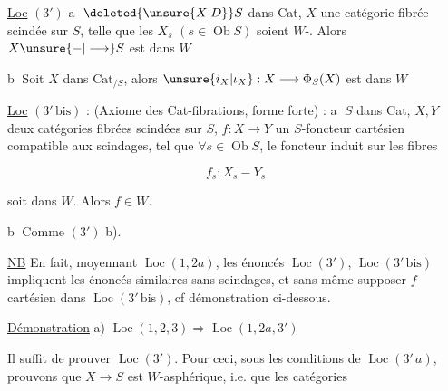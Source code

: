 



\uline{Loc} $(3')$ \textcircled{a}   $\deleted{\unsure{X|D}}S$ dans Cat, $X$ une catégorie fibrée scindée sur $S$, telle que les  $X_s$ $(s\in\operatorname{Ob}S)$ soient $W$-. Alors $X\unsure{{-}|\longrightarrow} S$ est dans $W$

\textcircled{b} Soit $X$ dans $\mathrm{Cat}_{/S}$, alors $\unsure{i_X|\iota_X}:X\longrightarrow\Phi_S(X)$ est dans $W$


\uline{Loc} $(3'\,\mathrm{bis})$ : (Axiome des Cat-fibrations, forme  forte) : \textcircled{a}  $S$ dans Cat, $X,Y$ deux catégories fibrées scindées sur $S$, $f:X\longrightarrow Y$ un $S$-foncteur cartésien compatible aux scindages, tel que $\forall s\in\operatorname{Ob}S$, le foncteur induit sur les fibres

\[
f_s:X_s{-}Y_s
\]

soit dans $W$. Alors $f\in W$.

\textcircled{b} Comme  $(3')$ b).

\uline{NB} En fait, moyennant $\operatorname{Loc}(1,2a)$, les énoncés $\operatorname{Loc}(3')$, $\operatorname{Loc}(3'\,\mathrm{bis})$ impliquent les énoncés similaires sans scindages, et sans même supposer $f$ cartésien dans $\operatorname{Loc}(3'\,\mathrm{bis})$, cf démonstration ci-dessous.

\uline{Démonstration} \qquad a) $\operatorname{Loc}(1,2,3)\Longrightarrow\operatorname{Loc}(1,2a,3')$

Il suffit de prouver $\operatorname{Loc}(3')$.  Pour ceci, sous les conditions de $\operatorname{Loc}(3'\,a)$, prouvons que $X\longrightarrow S$ est $W$-asphérique, i.e. que les catégories

